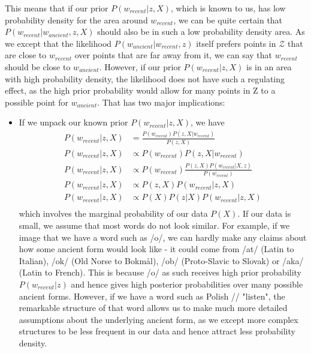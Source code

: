 \documentclass[6pt]{article}
\begin{document}
This means that if our prior $P(w_{recent}|z,X)$, which is known to us, has low probability density for the area around $w_{recent}$, we can be quite certain that $P(w_{recent}|w_{ancient},z,X)$ should also be in such a low probability density area. As we except that the likelihood  $P(w_{ancient}|w_{recent},z)$ itself prefers points in $\mathcal{Z}$ that are close to $w_{recent}$ over points that are far away from it, we can say that $w_{recent}$ should be close to $w_{ancient}$. 
However, if our prior $P(w_{recent}|z,X)$ is in an area with high probability density, the likelihood does not have such a regulating effect, as the high prior probability would allow for many points in Z to a possible point for $w_{ancient}$. 
That has two major implications:


\begin{itemize}
\item  If we unpack our known prior $P(w_{recent}|z,X)$, we have
\begin{equation}
\begin{split}
P(w_{recent}|z,X)  & = \frac{P(w_{recent})P(z,X|w_{recent})}{P(z,X)} \\
P(w_{recent}|z,X) & \propto P(w_{recent})P(z,X|w_{recent})\\
P(w_{recent}|z,X) & \propto P(w_{recent})\frac{P(z,X)P(w_{recent}|X,z)}{P(w_{recent})}\\
P(w_{recent}|z,X) & \propto P(z,X)P(w_{recent}|z,X)\\
P(w_{recent}|z,X) & \propto P(X)P(z|X)P(w_{recent}|z,X)\\
\end{split}
\end{equation}
which involves the marginal probability of our data $P(X)$. If our data is small,  we assume that most words do not look similar. 
For example, if we image that we have a word such as  /o/, we can hardly make any claims about how some ancient form would look like - it could come from /at/ (Latin to Italian), /ok/ (Old Norse to Bokm\r{a}l), /ob/ (Proto-Slavic to Slovak) or /aka/ (Latin to French). This is because /o/ as such receives high prior probability $P(w_{recent}|z)$ and hence gives high posterior probabilities over many possible ancient forms. However, if we have a word such as Polish // "listen", the remarkable structure of that word allows us to make much more detailed assumptions about the underlying ancient form, as we except more complex structures to be less frequent in our data and hence attract less probability density. 

\end{itemize}
\end{document}
